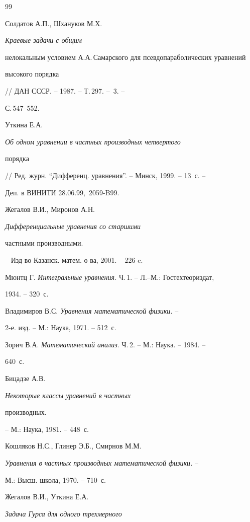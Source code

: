 \begin{thebibliography}{99}







Солдатов А.П., Шхануков М.Х. {\it Краевые задачи с общим


нелокальным условием А.А.\,Са\-мар\-ского для псевдопараболических уравнений


высокого порядка} // ДАН СССР. -- 1987. -- Т.\,297. -- \No\,3. --


С.\,547--552.




Уткина Е.А. {\it Об одном уравнении в частных производных четвертого


порядка} // Ред. журн. ``Дифференц. уравнения''. -- Минск, 1999. -- 13~с. --


Деп. в ВИНИТИ 28.06.99, \No\,2059-B99.




Жегалов В.И., Миронов А.Н. {\it Дифференциальные уравнения со старшими


частными производными.} -- Изд-во Казанск. матем. о-ва, 2001. -- 226 c.




Мюнтц Г. {\it Интегральные уравнения.} Ч.\,1. -- Л.--М.: Гостехтеориздат,


1934. -- 320~с.




Владимиров В.С. {\it Уравнения математической физики.} --


2-е. изд. -- М.: Наука, 1971. -- 512~с.




Зорич В.А. {\it Математический анализ.} Ч.\,2. -- М.: Наука. -- 1984. --


640~с.




Бицадзе А.В. {\it Некоторые классы уравнений в частных


производных.} -- М.: Наука, 1981. -- 448~с.




Кошляков Н.С., Глинер Э.Б., Смирнов М.М.


{\it Уравнения в частных производных математической физики.} --


М.: Высш. школа, 1970. -- 710~с.




Жегалов В.И., Уткина Е.А. {\it Задача Гурса для одного трехмерного


}
\end{thebibliography}
